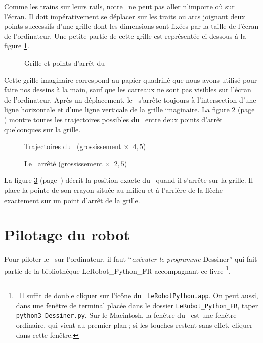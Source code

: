 \smallskip

Comme les trains sur leurs rails, notre \robot\ ne peut pas aller 
n'importe où sur l'écran. Il doit impérativement se déplacer sur 
les traits ou arcs joignant deux points successifs d'une grille dont les dimensions sont 
fixées par la taille de l'écran de l'ordinateur. Une petite partie de cette grille
est  représentée \hbox{ci-dessous} à la figure \ref{fig:grille}.
%
\begin{figure}[htbp]
 \caption{Grille et points d'arrêt du \protect\robot}
 \label{fig:grille}
\end{figure}

\noindent Cette grille imaginaire correspond au papier quadrillé que nous avons utilisé pour
faire nos dessins à la main, sauf que les carreaux ne sont pas visibles sur 
l'écran de l'ordinateur. 
Après un déplacement, le \robot\ s'arrête toujours à l'intersection
d'une ligne horizontale et d'une ligne verticale de la grille imaginaire. La figure
 \ref{fig:traject} (page \pageref{fig:traject}) montre toutes les trajectoires possibles
du \robot\ entre deux points d'arrêt quelconques sur la grille.
\begin{figure}[htbp]
 \caption{Trajectoires du \protect\robot\ (grossissement $\times$\ $4,5$)}
 \label{fig:traject}
\end{figure}
\begin{figure}[htbp]
 \caption{Le \protect\robot\ arrêté (grossissement $\times$\ $2,5$)}
 \label{fig:robot-arrete}
\end{figure}
La figure \ref{fig:robot-arrete} \hbox{(page \pageref{fig:robot-arrete})} 
décrit la position
exacte du \robot\ quand il s'arrête sur la grille. Il place la pointe de
son crayon située au milieu et à l'arrière de la flèche exactement sur
un point d'arrêt de la grille.


\section{Pilotage du robot} 

Pour piloter le \robot\ sur l'ordinateur, il faut ``{\em exécuter le programme}
{\idt Des\-si\-ner}'' qui fait partie de la bibliothèque {\idt LeRobot\_Python\_FR}
accompagnant ce livre%
\footnote{\ Il suffit de double cliquer sur l'icône du \robot\ {\tt LeRobotPython.app}.
On peut aussi, dans une fenêtre de terminal placée dans le dossier
{\tt LeRobot\_Python\_FR}, taper
{\tt python3 Des\-si\-ner.py}. Sur le Macintosh, la fenêtre du \robot\ est une fenêtre
ordinaire, qui vient au premier plan$\:$; si les touches restent sans effet, cliquer
dans cette fenêtre.}. 


